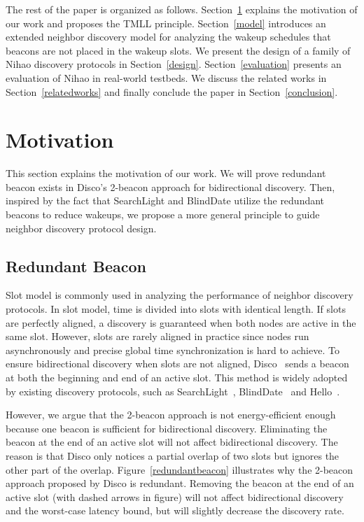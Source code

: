 \documentclass[conference]{IEEEtran}
\begin{document}
The rest of the paper is organized as follows.
Section~\ref{motivation} explains the motivation of our work and proposes the TMLL principle.
Section~\ref{model} introduces an extended neighbor discovery model for analyzing the wakeup schedules that beacons are not placed in the wakeup slots.
We present the design of a family of Nihao discovery protocols in Section~\ref{design}.
Section~\ref{evaluation} presents an evaluation of Nihao in real-world testbeds.
We discuss the related works in Section~\ref{relatedworks} and finally conclude the paper in Section~\ref{conclusion}.

\section{Motivation}\label{motivation}
This section explains the motivation of our work. We will prove redundant beacon exists in Disco's 2-beacon approach for bidirectional discovery.
Then, inspired by the fact that SearchLight and BlindDate utilize the redundant beacons to reduce wakeups,
we propose a more general principle to guide neighbor discovery protocol design.

\subsection{Redundant Beacon}\label{redundantbeaconsection}
Slot model is commonly used in analyzing the performance of neighbor discovery protocols.
In slot model, time is divided into slots with identical length. If slots are perfectly aligned, a discovery is guaranteed when both nodes are active in the same slot.
However, slots are rarely aligned in practice since nodes run asynchronously and precise global time synchronization is hard to achieve.
To ensure bidirectional discovery when slots are not aligned, Disco~\cite{dutta2008practical} sends a beacon at both the beginning and end of an active slot.
This method is widely adopted by existing discovery protocols, such as SearchLight~\cite{bakht2012mobicom}, BlindDate~\cite{wang2015blinddate} and Hello~\cite{sun2014hello}.

However, we argue that the 2-beacon approach is not energy-efficient enough because one beacon is sufficient for bidirectional discovery.
Eliminating the beacon at the end of an active slot will not affect bidirectional discovery.
The reason is that Disco only notices a partial overlap of two slots but ignores the other part of the overlap.
Figure~\ref{redundantbeacon} illustrates why the 2-beacon approach proposed by Disco is redundant.
Removing the beacon at the end of an active slot (with dashed arrows in figure) will not affect bidirectional discovery and the worst-case latency bound,
but will slightly decrease the discovery rate.
\end{document}
